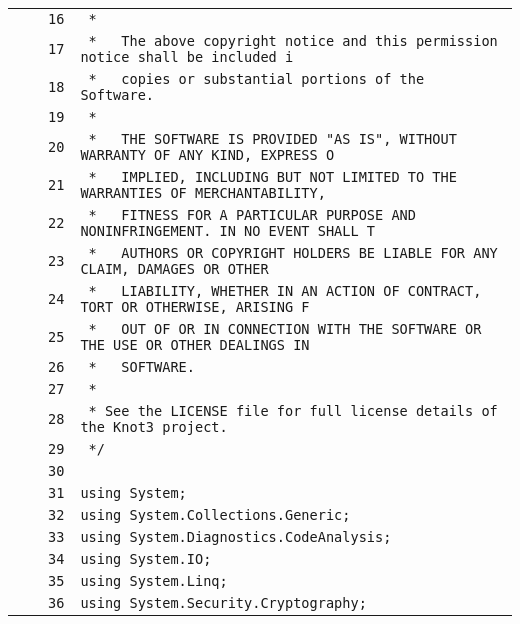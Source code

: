 \documentclass[a4paper,10pt]{article}
\begin{document}
\begin{longtable}[l]{lrrl}
\cellcolor{gray} &  & \verb~16~ & \verb~ *~\\
\cellcolor{gray} &  & \verb~17~ & \verb~ *   The above copyright notice and this permission notice shall be included i~\\
\cellcolor{gray} &  & \verb~18~ & \verb~ *   copies or substantial portions of the Software.~\\
\cellcolor{gray} &  & \verb~19~ & \verb~ *~\\
\cellcolor{gray} &  & \verb~20~ & \verb~ *   THE SOFTWARE IS PROVIDED "AS IS", WITHOUT WARRANTY OF ANY KIND, EXPRESS O~\\
\cellcolor{gray} &  & \verb~21~ & \verb~ *   IMPLIED, INCLUDING BUT NOT LIMITED TO THE WARRANTIES OF MERCHANTABILITY,~\\
\cellcolor{gray} &  & \verb~22~ & \verb~ *   FITNESS FOR A PARTICULAR PURPOSE AND NONINFRINGEMENT. IN NO EVENT SHALL T~\\
\cellcolor{gray} &  & \verb~23~ & \verb~ *   AUTHORS OR COPYRIGHT HOLDERS BE LIABLE FOR ANY CLAIM, DAMAGES OR OTHER~\\
\cellcolor{gray} &  & \verb~24~ & \verb~ *   LIABILITY, WHETHER IN AN ACTION OF CONTRACT, TORT OR OTHERWISE, ARISING F~\\
\cellcolor{gray} &  & \verb~25~ & \verb~ *   OUT OF OR IN CONNECTION WITH THE SOFTWARE OR THE USE OR OTHER DEALINGS IN~\\
\cellcolor{gray} &  & \verb~26~ & \verb~ *   SOFTWARE.~\\
\cellcolor{gray} &  & \verb~27~ & \verb~ *~\\
\cellcolor{gray} &  & \verb~28~ & \verb~ * See the LICENSE file for full license details of the Knot3 project.~\\
\cellcolor{gray} &  & \verb~29~ & \verb~ */~\\
\cellcolor{gray} &  & \verb~30~ & \verb~~\\
\cellcolor{gray} &  & \verb~31~ & \verb~using System;~\\
\cellcolor{gray} &  & \verb~32~ & \verb~using System.Collections.Generic;~\\
\cellcolor{gray} &  & \verb~33~ & \verb~using System.Diagnostics.CodeAnalysis;~\\
\cellcolor{gray} &  & \verb~34~ & \verb~using System.IO;~\\
\cellcolor{gray} &  & \verb~35~ & \verb~using System.Linq;~\\
\cellcolor{gray} &  & \verb~36~ & \verb~using System.Security.Cryptography;~\\

\end{longtable}
\end{document}
